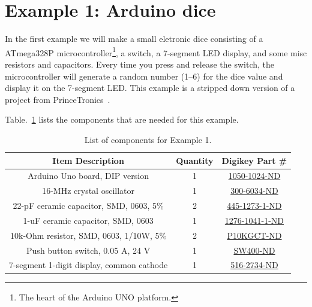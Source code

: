 \documentclass[12pt,letterpaper]{scrartcl}
\begin{document}
\newpage
\section{Example 1: Arduino dice}
In the first example we will make a small eletronic dice consisting of a ATmega328P microcontroller\footnote{The heart of the Arduino UNO platform.}, a switch, a 7-segment LED display, and some misc resistors and capacitors. Every time you press and release the switch, the microcontroller will generate a random number (1--6) for the dice value and display it on the 7-segment LED. This example is a stripped down version of a project from PrinceTronics~\cite{dice}. 

Table.~\ref{tab:example1} lists the components that are needed for this example.

\begin{table}[h]
\centering
\caption{List of components for Example 1.}
\begin{tabular}{|c|c|c|}
\hline \bf  Item Description & \bf Quantity & \bf Digikey Part \# \\ 
\hline \hline  Arduino Uno board, DIP version & 1 & \href{http://www.digikey.com/product-detail/en/A000066/1050-1024-ND/2784006}{1050-1024-ND} \\ 
\hline  16-MHz crystal oscillator &  1 & \href{http://www.digikey.com/product-search/en?KeyWords=300-8499-ND}{300-6034-ND} \\ 
\hline  22-pF ceramic capacitor, SMD, 0603, 5\% & 2 & \href{http://www.digikey.com/product-detail/en/C1608C0G1H220J080AA/445-1273-1-ND/567670}{445-1273-1-ND}  \\ 
\hline  1-uF ceramic capacitor, SMD, 0603 & 1 & \href{http://www.digikey.com/product-detail/en/CL10F105ZP8NNNC/1276-1041-1-ND/3889127}{1276-1041-1-ND}  \\ 
\hline  10k-Ohm resistor, SMD, 0603, 1/10W, 5\% & 2 & \href{http://www.digikey.com/product-detail/en/ERJ-3GEYJ103V/P10KGCT-ND/134717}{P10KGCT-ND} \\ 
\hline  Push button switch, 0.05 A, 24 V  & 1 & \href{http://www.digikey.com/product-search/en?KeyWords=SW400-ND}{SW400-ND} \\ 
\hline  7-segment 1-digit display, 
common cathode & 1 & \href{http://www.digikey.com/product-detail/en/HDSP-313E/516-2734-ND/2219051}{516-2734-ND} \\ 
\hline 
\end{tabular} 
\label{tab:example1}
\end{table}
\end{document}
